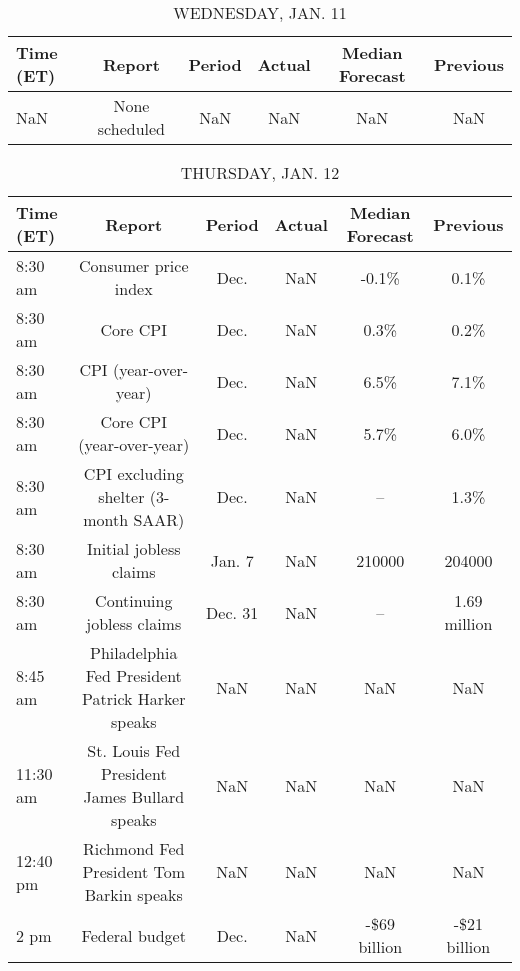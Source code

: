 \documentclass{article}%
\begin{document}
%


\begin{table}[htbp]%
\caption{WEDNESDAY, JAN. 11}%
\centering%
\begin{adjustbox}{width=1\textwidth}%
\begin{tabular}{lccccc}
\toprule
Time (ET) &         Report & Period & Actual & Median Forecast & Previous \\
\midrule
      NaN & None scheduled &    NaN &    NaN &             NaN &      NaN \\
\bottomrule
\end{tabular}
%
\end{adjustbox}%
\end{table}

%


\begin{table}[htbp]%
\caption{THURSDAY, JAN. 12}%
\centering%
\begin{adjustbox}{width=1\textwidth}%
\begin{tabular}{lccccc}
\toprule
Time (ET) &                                           Report &  Period & Actual & Median Forecast &     Previous \\
\midrule
  8:30 am &                             Consumer price index &    Dec. &    NaN &           -0.1\% &         0.1\% \\
  8:30 am &                                         Core CPI &    Dec. &    NaN &            0.3\% &         0.2\% \\
  8:30 am &                             CPI (year-over-year) &    Dec. &    NaN &            6.5\% &         7.1\% \\
  8:30 am &                        Core CPI (year-over-year) &    Dec. &    NaN &            5.7\% &         6.0\% \\
  8:30 am &             CPI excluding shelter (3-month SAAR) &    Dec. &    NaN &              -- &         1.3\% \\
  8:30 am &                           Initial jobless claims &  Jan. 7 &    NaN &          210000 &       204000 \\
  8:30 am &                        Continuing jobless claims & Dec. 31 &    NaN &              -- & 1.69 million \\
  8:45 am & Philadelphia Fed President Patrick Harker speaks &     NaN &    NaN &             NaN &          NaN \\
 11:30 am &     St. Louis Fed President James Bullard speaks &     NaN &    NaN &             NaN &          NaN \\
 12:40 pm &         Richmond Fed President Tom Barkin speaks &     NaN &    NaN &             NaN &          NaN \\
     2 pm &                                   Federal budget &    Dec. &    NaN &    -\$69 billion & -\$21 billion \\
\bottomrule
\end{tabular}
%
\end{adjustbox}%
\end{table}
\end{document}

